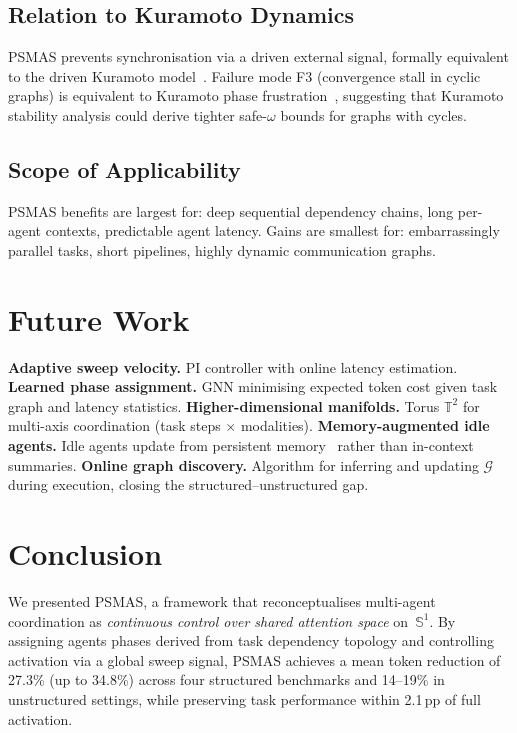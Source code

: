 \documentclass[10pt,twocolumn]{article}
\theoremstyle{plain}
\theoremstyle{definition}
\theoremstyle{remark}
\newcommand{\G}{\mathcal{G}}
\newcommand{\sweepvel}{\omega}
\newcommand{\Sone}{\mathbb{S}^1}
\begin{document}
\subsection{Relation to Kuramoto Dynamics}

PSMAS prevents synchronisation via a driven external signal,
formally equivalent to the driven Kuramoto model~\citep{acebron2005kuramoto}.
Failure mode F3 (convergence stall in cyclic graphs) is equivalent to
Kuramoto phase frustration~\citep{strogatz2000from}, suggesting that
Kuramoto stability analysis could derive tighter safe-$\sweepvel$
bounds for graphs with cycles.

\subsection{Scope of Applicability}

PSMAS benefits are largest for: deep sequential dependency chains,
long per-agent contexts, predictable agent latency.
Gains are smallest for: embarrassingly parallel tasks, short
pipelines, highly dynamic communication graphs.

\section{Future Work}
\label{sec:future}

\textbf{Adaptive sweep velocity.}  PI controller with online latency
estimation.
\textbf{Learned phase assignment.}  GNN minimising expected token cost
given task graph and latency statistics.
\textbf{Higher-dimensional manifolds.}  Torus $\mathbb{T}^2$ for
multi-axis coordination (task steps $\times$ modalities).
\textbf{Memory-augmented idle agents.}  Idle agents update from
persistent memory~\citep{park2023generative} rather than in-context
summaries.
\textbf{Online graph discovery.}  Algorithm for inferring and updating
$\G$ during execution, closing the structured--unstructured gap.

\section{Conclusion}
\label{sec:conclusion}

We presented PSMAS, a framework that reconceptualises multi-agent
coordination as \emph{continuous control over shared attention space}
on~$\Sone$.  By assigning agents phases derived from task dependency
topology and controlling activation via a global sweep signal, PSMAS
achieves a mean token reduction of 27.3\% (up to 34.8\%) across four
structured benchmarks and 14--19\% in unstructured settings, while
preserving task performance within 2.1\,pp of full activation.
\end{document}
